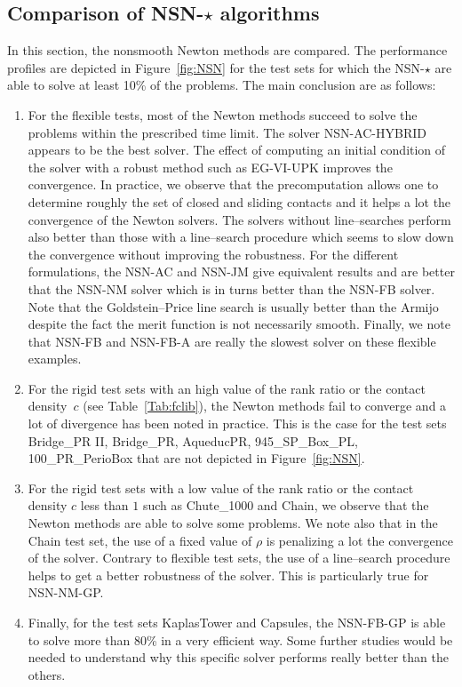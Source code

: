\subsection{Comparison of {\sf NSN-$\star$} algorithms}

In this section,  the nonsmooth Newton methods  are compared.  The performance profiles are depicted in Figure~\ref{fig:NSN} for the test sets for which the {\sf NSN-$\star$} are able to solve at least 10\% of the problems. The main conclusion are as follows:
\begin{enumerate}
\item For the flexible tests, most of the Newton methods succeed to solve the problems within the prescribed time limit. The solver {\sf NSN-AC-HYBRID} appears to be the best solver.  The effect of computing an initial condition of the solver with a robust method such as {\sf EG-VI-UPK}  improves the convergence. In practice, we observe that the precomputation allows one to determine roughly the set of closed and sliding contacts and it helps a lot the convergence of the Newton solvers. The solvers without line--searches perform also better than those with a line--search procedure which  seems to slow down the convergence without improving the robustness.  For the different formulations, the {\sf NSN-AC} and {\sf NSN-JM} give equivalent results and are better that the {\sf NSN-NM} solver which is in turns better than the {\sf NSN-FB} solver. Note that the Goldstein--Price line search is usually better than the Armijo despite the fact the merit function is not necessarily smooth. Finally, we note that  {\sf NSN-FB}  and {\sf NSN-FB-A} are really the slowest solver on these flexible examples.
\item For the rigid test sets with an high value of the rank ratio or the contact density~$c$ (see Table~\ref{Tab:fclib}), the Newton methods fail to converge and a lot of divergence has been noted in practice. This is the case for the test sets Bridge\_PR II, Bridge\_PR, AqueducPR, 945\_SP\_Box\_PL, 100\_PR\_PerioBox that are not depicted in Figure~\ref{fig:NSN}.
\item For the rigid test sets with a low value of the rank ratio or the contact density $c$ less than $1$ such as Chute\_1000 and Chain, we observe that the Newton methods are able to solve some problems. We note also that in the Chain test set, the use of a fixed value of $\rho$ is penalizing a lot the convergence of the solver. Contrary to flexible test sets, the use of a line--search procedure helps  to get a better robustness  of the solver. This is particularly true for {\sf NSN-NM-GP}.
\item Finally, for the test sets KaplasTower and Capsules, the {\sf NSN-FB-GP} is able to solve more than 80\% in a very efficient way. Some further studies would be needed to understand why this specific solver performs really better than the others.
\end{enumerate}
